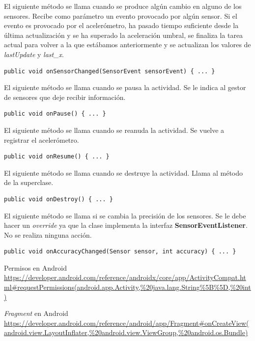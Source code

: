 \documentclass[11pt,a4paper]{article}
\begin{document}
El siguiente método se llama cuando se produce algún cambio en alguno de los sensores. Recibe como parámetro un evento provocado
por algún sensor. Si el evento es provocado por el acelerómetro, ha pasado tiempo suficiente desde la última actualización y se ha
superado la aceleración umbral, se finaliza la tarea actual para volver a la que estábamos anteriormente y se actualizan los valores de \textit{lastUpdate} y \textit{last\_x}.

\begin{lstlisting}
public void onSensorChanged(SensorEvent sensorEvent) { ... }
\end{lstlisting}

El siguiente método se llama cuando se pausa la actividad. Se le indica al gestor de sensores que deje recibir información.

\begin{lstlisting}
public void onPause() { ... }
\end{lstlisting}

El siguiente método se llama cuando se reanuda la actividad. Se vuelve a registrar el acelerómetro.

\begin{lstlisting}
public void onResume() { ... }
\end{lstlisting}

El siguiente método se llama cuando se destruye la actividad. Llama al método de la superclase.

\begin{lstlisting}
public void onDestroy() { ... }
\end{lstlisting}

El siguiente método se llama si se cambia la precisión de los sensores. Se le debe hacer un \textit{override} ya que la clase
implementa la interfaz \textbf{SensorEventListener}. No se realiza ninguna acción.

\begin{lstlisting}
public void onAccuracyChanged(Sensor sensor, int accuracy) { ... }
\end{lstlisting}

\newpage

\begin{thebibliography}{5}

Permisos en Android
\\\url{https://developer.android.com/reference/androidx/core/app/ActivityCompat.html#requestPermissions(android.app.Activity,%20java.lang.String%5B%5D,%20int)}

\textit{Fragment} en Android
\\\url{https://developer.android.com/reference/android/app/Fragment#onCreateView(android.view.LayoutInflater,%20android.view.ViewGroup,%20android.os.Bundle)}

\end{thebibliography}
\end{document}
